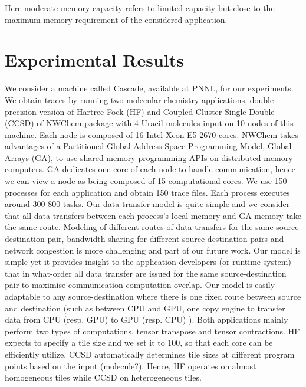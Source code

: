 \documentclass[runningheads]{llncs} %
\begin{document}
Here moderate memory capacity refers to limited capacity but close to the maximum memory  requirement of the considered application.





	\section{Experimental Results}
	\label{sec:exp}
	
	
	We consider a machine called Cascade, available at PNNL, for our experiments. We obtain traces by running  two molecular chemistry applications,  double precision version of Hartree-Fock (HF) and Coupled Cluster Single Double (CCSD) of NWChem package with 4 Uracil molecules input on 10 nodes of this machine. Each node is composed of 16 Intel Xeon E5-2670 cores. NWChem takes advantages of a Partitioned Global Address Space Programming Model, Global Arrays (GA), to use shared-memory programming APIs  on distributed memory computers. GA dedicates one core of each node to handle communication, hence we can view a node as being composed of 15 computational cores. We use 150 processes for each application and obtain 150 trace files. Each process executes around 300-800 tasks. Our data transfer model is quite simple and  we consider that all data transfers between each process's local memory and GA memory take the same route. Modeling of different routes of data transfers for the same source-destination pair, bandwidth sharing for different source-destination pairs and network congestion is more challenging and part of our future work. Our model is simple yet it provides insight to the application developers (or runtime system) that  in what-order all data transfer  are issued for the same source-destination pair to maximise communication-computation overlap. Our model is easily adaptable to any source-destination where there is one fixed route between source and destination (such as between CPU and GPU, one copy engine to transfer data from CPU (resp. GPU) to GPU (resp. CPU) ).
	Both applications mainly perform two types of computations, tensor transpose and tensor contractions.  HF expects to specify a tile size and we set it to 100, so that each core can be efficiently utilize.  CCSD automatically determines tile sizes at different program points based on the input (molecule?).  Hence, HF operates on almost homogeneous tiles while CCSD on heterogeneous tiles.
	
\end{document}

